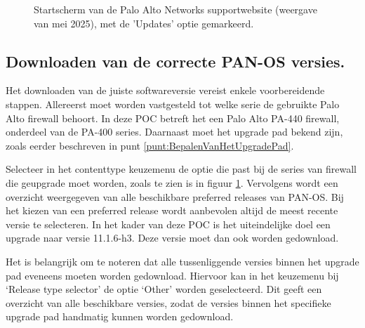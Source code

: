 \begin{figure}[H]
    \centering
    \caption[PA Support Homescreen]{\label{fig:PA_seriesKiezen} Startscherm van de Palo Alto Networks supportwebsite (weergave van mei 2025), met de 'Updates' optie gemarkeerd.}
\end{figure}



\subsection{Downloaden van de correcte PAN-OS versies.}
\label{punt:DownloadenCorrectePanVersie}

Het downloaden van de juiste softwareversie vereist enkele voorbereidende stappen. Allereerst moet worden vastgesteld tot welke serie de gebruikte Palo Alto firewall behoort. In deze POC betreft het een Palo Alto PA-440 firewall, onderdeel van de PA-400 series. Daarnaast moet het upgrade pad bekend zijn, zoals eerder beschreven in punt \ref{punt:BepalenVanHetUpgradePad}.

Selecteer in het contenttype keuzemenu de optie die past bij de series van firewall die geupgrade moet worden, zoals te zien is in figuur \ref{fig:PA_seriesKiezen}. Vervolgens wordt een overzicht weergegeven van alle beschikbare preferred releases van PAN-OS. Bij het kiezen van een preferred release wordt aanbevolen altijd de meest recente versie te selecteren. In het kader van deze POC is het uiteindelijke doel een upgrade naar versie 11.1.6-h3. Deze versie moet dan ook worden gedownload.

Het is belangrijk om te noteren dat alle tussenliggende versies binnen het upgrade pad eveneens moeten worden gedownload. Hiervoor kan in het keuzemenu bij ‘Release type selector’ de optie ‘Other’ worden geselecteerd. Dit geeft een overzicht van alle beschikbare versies, zodat de versies binnen het specifieke upgrade pad handmatig kunnen worden gedownload.


